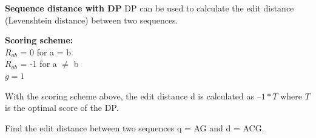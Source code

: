 \question \textbf{Sequence distance with DP}
DP can be used to calculate the edit distance (Levenshtein distance) between two sequences.

\medskip 

\textbf{Scoring scheme: }\\
\null \quad $R_{ab}$ = 0 for a = b \\ 
\null \quad $R_{ab}$ = -1 for a $\neq$ b \\ 
\null \quad $g = 1$

\vspace{0.1 in}


\vspace{0.1 in}

With the scoring scheme above, the edit distance d is calculated as $–1 * T$ where $T$ is the optimal score of the DP.

Find the edit distance between two sequences q = AG and d = ACG.

